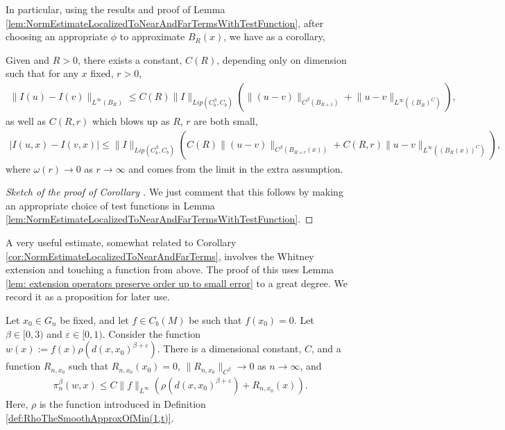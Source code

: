 \documentclass[11pt,reqno]{amsart}
\numberwithin{equation}{section}
\theoremstyle{plain}
\def\ep{\varepsilon}
\def\om{\omega}
\newcommand{\abs}[1]{\left| #1 \right|}
\newcommand{\norm}[1]{\lVert#1\rVert}
\begin{document}
In particular, using the results and proof of Lemma \ref{lem:NormEstimateLocalizedToNearAndFarTermsWithTestFunction}, after choosing an appropriate $\phi$ to approximate $B_R(x)$, we have as a corollary,

\begin{cor}\label{cor:NormEstimateLocalizedToNearAndFarTerms}
	Given and $R>0$, there exists a constant, $C(R)$, depending only on dimension such that for any $x$ fixed, $r>0$,
	\begin{align*}
		\norm{I(u)-I(v)}_{L^\infty(B_R)}
		\leq C(R)\norm{I}_{Lip(C^\beta_b,C_b)}
		\left(
		\norm{(u-v)}_{C^\beta(B_{R+1})}
		+\norm{u-v}_{L^\infty((B_R)^C)}
		\right),
	\end{align*}
	as well as $C(R,r)$ which blows up as $R$, $r$ are both small,
	\begin{align*}
		\abs{I(u,x)-I(v,x)}
		\leq \norm{I}_{Lip(C^\beta_b,C_b)}
		\left(
		C(R)\norm{(u-v)}_{C^\beta(B_{R+r}(x))}
		+C(R,r)\norm{u-v}_{L^\infty((B_R(x))^C)}
		\right),
	\end{align*}
	where $\om(r)\to0$ as $r\to\infty$ and comes from the limit in the extra assumption. 
	
\end{cor}


\begin{proof}[Sketch of the proof of Corollary ]
	
	We just comment that this follows by making an appropriate choice of test functions in Lemma \ref{lem:NormEstimateLocalizedToNearAndFarTermsWithTestFunction}.
\end{proof}


A very useful estimate, somewhat related to Corollary \ref{cor:NormEstimateLocalizedToNearAndFarTerms}, involves the Whitney extension and touching a function from above. The proof of this uses Lemma \ref{lem: extension operators preserve order up to small error} to a great degree. We record it as a proposition for later use.

\begin{prop}\label{prop:WhitneyObeysBetaTouchingFromAbove}
	Let $x_0 \in G_n$ be fixed, and let $f\in C_b(M)$ be such that $f(x_0)=0$. Let $\beta\in [0,3)$ and $\ep\in[0,1)$.  Consider the function $w(x):=f(x)\rho(d(x,x_0)^{\beta+\ep})$.  There is a dimensional constant, $C$, and a function $R_{n,x_0}$ such that $R_{n,x_0}(x_0)=0$, $\|R_{n,x_0}\|_{C^\beta} \to 0$ as $n\to\infty$, and
	\begin{align*}
		\pi_n^\beta(w,x)\leq C \norm{f}_{L^\infty}(\rho(d(x,x_0)^{\beta+\ep})+R_{n,x_0}(x)).
	\end{align*}
	Here, $\rho$ is the function introduced in Definition \ref{def:RhoTheSmoothApproxOfMin(1,t)}.
\end{prop}
\end{document}
